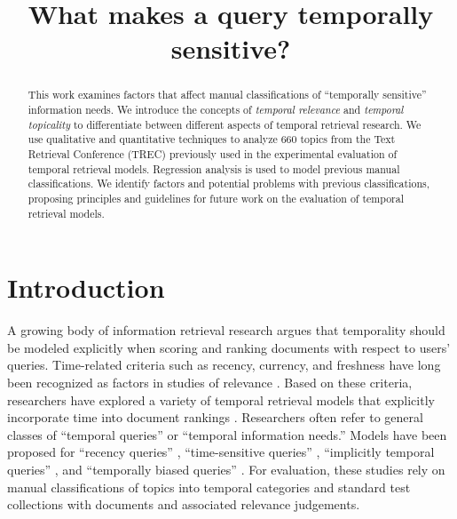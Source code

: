\documentclass{asist}
\begin{document}
\author{}


\title{What makes a query temporally sensitive?}

\maketitle


\begin{abstract}

This work examines factors that affect manual classifications of ``temporally sensitive'' information needs.  We introduce the concepts of \emph{temporal relevance} and \emph{temporal topicality} to differentiate between different aspects of temporal retrieval research. We use qualitative and quantitative techniques to analyze 660 topics from the Text Retrieval Conference (TREC) previously used in the experimental evaluation of temporal retrieval models.  Regression analysis is used to model previous manual classifications. We identify factors and potential problems with previous classifications, proposing principles and guidelines for future work on the evaluation of temporal retrieval models. 

\end{abstract}


\section{Introduction}

A growing body of information retrieval research argues that temporality should be modeled explicitly when scoring and ranking documents with respect to users' queries. Time-related criteria such as recency, currency, and freshness have long been recognized as factors in studies of relevance \cite{Barry1998, Mizzaro1997, Dai2010, Dong2010}. Based on these criteria, researchers have explored a variety of temporal retrieval models that explicitly incorporate time into document rankings \cite{Li2003,Efron2011,Dakka2012,Kanhabua2011,Kanhabua2012a,Peetz2013a}. Researchers often refer to general classes of ``temporal queries'' or ``temporal information needs.''  Models have been proposed for ``recency queries'' \cite{Li2003,Efron2011}, ``time-sensitive queries'' \cite{Dakka2012}, ``implicitly temporal queries'' \cite{Metzler2009}, and ``temporally biased queries'' \cite{Jones2007}.  For evaluation,  these studies rely on manual classifications of topics into temporal categories and standard test collections with documents and associated relevance judgements.
\end{document}
